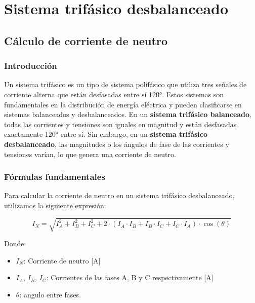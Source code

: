 \documentclass[../main]{subfiles}
\begin{document}
\chapter{Sistema trifásico desbalanceado}
\section{Cálculo de corriente de neutro}
\subsection{Introducción}
Un sistema trifásico es un tipo de sistema polifásico que utiliza
tres señales de corriente alterna que están desfasadas entre sí 120°.
Estos sistemas son fundamentales en la distribución de energía
eléctrica y pueden clasificarse en sistemas balanceados y
desbalanceados. En un \textbf{sistema trifásico balanceado}, todas
las corrientes y tensiones son iguales en magnitud y están desfasadas
exactamente 120° entre sí. Sin embargo, en un \textbf{sistema
trifásico desbalanceado}, las magnitudes o los ángulos de fase de las
corrientes y tensiones varían, lo que genera una corriente de neutro.


\subsection{Fórmulas fundamentales}

Para calcular la corriente de neutro en un sistema trifásico
desbalanceado, utilizamos la siguiente expresión:

\begin{equation}
  I_N = \sqrt{I_A^2 + I_B^2 + I_C^2 + 2  \cdot (I_A \cdot I_B + I_B
  \cdot I_C + I_C \cdot I_A) \cdot \cos(\theta)}
\end{equation}

Donde:
\begin{itemize}
  \item $I_N$: Corriente de neutro [A]
  \item $I_A$, $I_B$, $I_C$: Corrientes de las fases A, B y C
    respectivamente [A]
  \item $\theta$: angulo entre fases.
\end{itemize}
\end{document}
